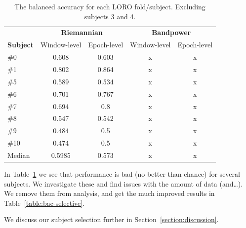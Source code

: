         \begin{table}[h]
            \centering
            \begin{tabular}{lcccc}
                \toprule
                & \multicolumn{2}{c}{\textbf{Riemannian}} & \multicolumn{2}{c}{\textbf{Bandpower}} \\
                \cmidrule(lr){2-3}
                \cmidrule(lr){4-5}
                \textbf{Subject} & Window-level & Epoch-level & Window-level & Epoch-level \\
                \midrule
                \#0  & 0.608  & 0.603 & x & x \\
                \#1  & 0.802  & 0.864 & x & x \\
                \#5  & 0.589  & 0.534 & x & x \\
                \#6  & 0.701  & 0.767 & x & x \\
                \#7  & 0.694  & 0.8   & x & x \\
                \#8  & 0.547  & 0.542 & x & x \\
                \#9  & 0.484  & 0.5   & x & x \\
                \#10 & 0.474  & 0.5   & x & x \\
                \midrule
                Median & 0.5985 & 0.573 & x & x \\
                \bottomrule
            \end{tabular}
            \caption{The balanced accuracy for each LORO fold/subject. Excluding subjects 3 and 4.}\label{table:bac-all}
        \end{table}

        In Table~\ref{table:bac-all} we see that performance is bad (no better than chance) for several subjects. We investigate these and find issues with the amount of data (and\ldots). We remove them from analysis, and get the much improved results in Table~\ref{table:bac-selective}.

        We discuss our subject selection further in Section~\ref{section:discussion}.

